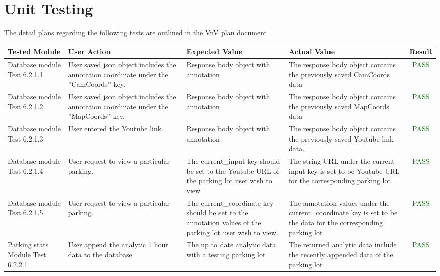 \documentclass[12pt, titlepage]{article}
\begin{document}
\section{Unit Testing}
The detail plans regarding the following tests are outlined in the
\hyperlink{https://github.com/parkd-app/park-d/blob/main/docs/VnVPlan/VnVPlan.pdf}{VnV
plan} document
\begin{center}
\begin{tabular}{|p{0.15\linewidth}|p{0.30\linewidth}|p{0.25\linewidth}|p{0.30\linewidth}|c|} 
\hline
\textbf{Tested Module} & \textbf{User Action} & \textbf{Expected Value} &
\textbf{Actual Value} & \textbf{Result} \\
\hline
Database module Test 6.2.1.1 & User saved json object includes the annotation
coordinate under the ”CamCoords” key. &  Response body object with annotation &
The response body object contains the previously saved CamCoords data &
\textcolor{Green}{PASS} \\
\hline
Database module Test 6.2.1.2 & User saved json object includes the annotation
coordinate under the ”MapCoords” key. &  Response body object with annotation &
The response body object contains the previously saved MapCoords data &
\textcolor{Green}{PASS} \\
\hline
Database module Test 6.2.1.3 & User entered the Youtube link. &  Response body
object with annotation & The response body object contains the previously saved
Youtube link data. & \textcolor{Green}{PASS} \\
\hline
Database module Test 6.2.1.4 & User request to view a particular parking. & The
current\_input key should be set to the Youtube URL of the parking lot user wish
to view & The string URL under the current input key is set to be Youtube URL
for the corresponding parking lot & \textcolor{Green}{PASS} \\
\hline
Database module Test 6.2.1.5 & User request to view a particular parking. & The
current\_coordinate key should be set to the annotation values of the parking
lot user wish to view & The annotation values under the current\_coordinate key
is set to be the data for the corresponding parking lot &
\textcolor{Green}{PASS} \\
\hline
Parking stats Module Test 6.2.2.1 & User append the analytic 1 hour data to the
database & The up to date analytic data with a testing parking lot &The returned
analytic data include the recently appended data of the parking lot &
\textcolor{Green}{PASS} \\
\hline
\end{tabular}


\end{center}
\end{document}
